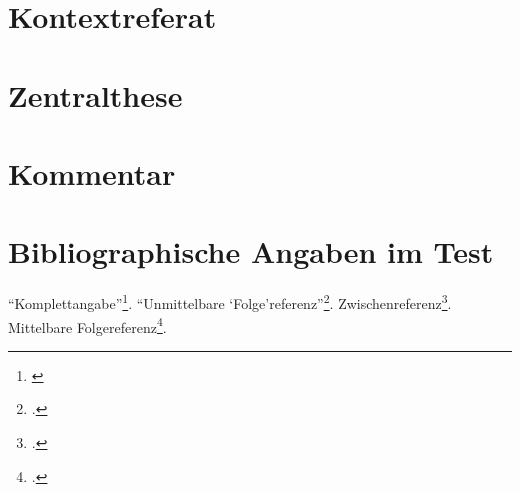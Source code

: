 %
%
%
%


%



\section{Kontextreferat}
\section{Zentralthese}
\section{Kommentar}

\section{Bibliographische Angaben im Test}

\enquote{Komplettangabe}\footnote{\cite[cf.][S.1]{Spielkamp2008a}}.
\enquote{Unmittelbare
\enquote{Folge}referenz}\footcite[cf.][S.2]{Spielkamp2008a}.
Zwischenreferenz\footcite[cf.][S.3]{DjoGehGraKreSpi2008a}. 
Mittelbare Folgereferenz\footcite[cf.][S.4]{Spielkamp2008a}.

%
